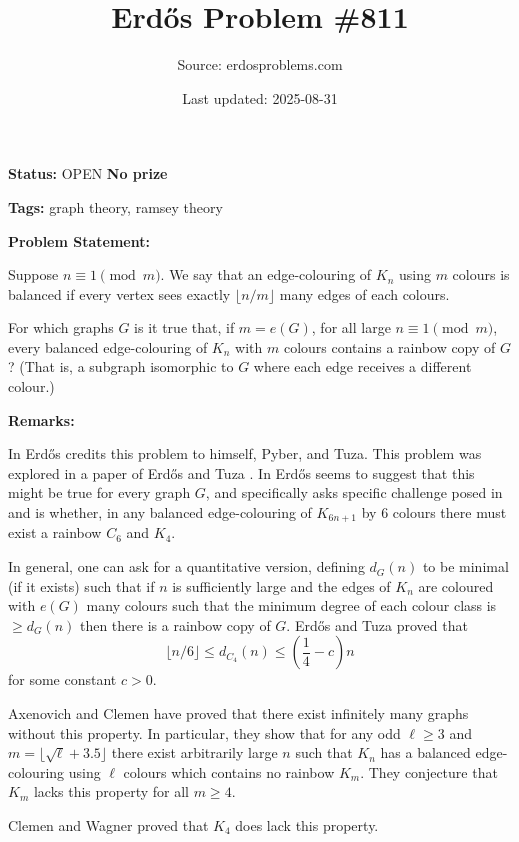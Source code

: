 \documentclass{article}
\title{Erd\H{o}s Problem \#811}
\date{Last updated: 2025-08-31}
\author{Source: erdosproblems.com}
\begin{document}
\maketitle

\noindent\textbf{Status:} OPEN \quad \textbf{No prize}

\noindent\textbf{Tags:} graph theory, ramsey theory

\medskip
\noindent\textbf{Problem Statement:}

Suppose $n\equiv 1\pmod{m}$. We say that an edge-colouring of $K_n$ using $m$ colours is balanced if every vertex sees exactly $\lfloor n/m\rfloor$ many edges of each colours. 

For which graphs $G$ is it true that, if $m=e(G)$, for all large $n\equiv 1\pmod{m}$, every balanced edge-colouring of $K_n$ with $m$ colours contains a rainbow copy of $G$? (That is, a subgraph isomorphic to $G$ where each edge receives a different colour.)

\bigskip
\noindent\textbf{Remarks:}

In \cite{Er91} Erd\H{o}s credits this problem to himself, Pyber, and Tuza. This problem was explored in a paper of Erd\H{o}s and Tuza \cite{ErTu93}. In \cite{Er96} Erd\H{o}s seems to suggest that this might be true for every graph $G$, and specifically asks specific challenge posed in \cite{Er91} and \cite{Er96} is whether, in any balanced edge-colouring of $K_{6n+1}$ by $6$ colours there must exist a rainbow $C_6$ and $K_4$.

In general, one can ask for a quantitative version, defining $d_G(n)$ to be minimal (if it exists) such that if $n$ is sufficiently large and the edges of $K_n$ are coloured with $e(G)$ many colours such that the minimum degree of each colour class is $\geq d_G(n)$ then there is a rainbow copy of $G$. Erd\H{o}s and Tuza \cite{ErTu93} proved that\[\lfloor n/6\rfloor \leq d_{C_4}(n) \leq \left(\frac{1}{4}-c\right)n\]for some constant $c>0$.

Axenovich and Clemen \cite{AxCl24} have proved that there exist infinitely many graphs without this property. In particular, they show that for any odd $\ell \geq 3$ and $m=\lfloor \sqrt{\ell}+3.5\rfloor$ there exist arbitrarily large $n$ such that $K_n$ has a balanced edge-colouring using $\ell$ colours which contains no rainbow $K_m$. They conjecture that $K_m$ lacks this property for all $m\geq 4$.

Clemen and Wagner \cite{ClWa23} proved that $K_4$ does lack this property.
\end{document}
